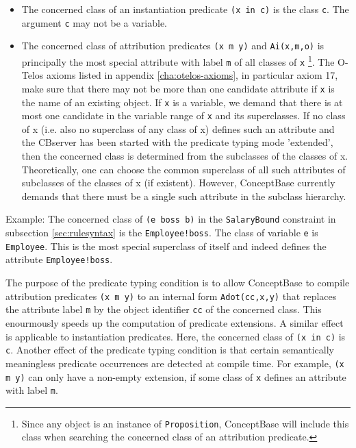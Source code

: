 \begin{itemize}
\item The concerned class of an instantiation predicate {\tt (x in c)} is the class {\tt c}.
The argument {\tt c} may not be a variable.
\item The concerned class of attribution predicates {\tt (x m y)} and {\tt Ai(x,m,o)} is principally the most 
special attribute with label {\tt m} of all classes of {\tt x}%
\footnote{Since any object is an instance of {\tt Proposition}, ConceptBase will include this class
when searching the concerned class of an attribution predicate.}.
The O-Telos axioms listed in
appendix \ref{cha:otelos-axioms}, in particular axiom 17, make sure that there may 
not be more than one
candidate attribute if {\tt x} is the name of an existing object. If {\tt x}
is a variable, we demand that there is at most one candidate in the variable range of {\tt x}
and its superclasses.
If no class of x (i.e. also no superclass of any class of x) defines such an attribute
and the CBserver has been started with the predicate typing mode 'extended', then
the concerned class is determined from the subclasses of the classes of x. Theoretically,
one can choose the common superclass of all such attributes of subclasses of the classes of x (if existent).
However, ConceptBase currently demands that there must be a single such attribute in the 
subclass hierarchy. 
\end{itemize}


Example: The concerned class of {\tt (e boss b)}  in the {\tt SalaryBound} constraint in subsection
\ref{sec:rulesyntax} is the {\tt Employee!boss}. The class of variable {\tt e} is {\tt Employee}. This
is the most special superclass of itself and indeed defines the attribute {\tt Employee!boss}.

The purpose of the predicate typing condition is to allow ConceptBase to compile
attribution predicates {\tt (x m y)} to an internal form {\tt Adot(cc,x,y)} that
replaces the attribute label {\tt m} by the object identifier {\tt cc} of the concerned class. 
This enourmously speeds up the computation of predicate extensions. 
A similar effect is applicable to instantiation predicates. Here, the
concerned class of {\tt (x in c)}  is {\tt c}. Another effect of the
predicate typing condition is that certain semantically meaningless 
predicate occurrences are detected at compile time. For example,
{\tt (x m y)} can only have a non-empty extension, if some class of
{\tt x} defines an attribute with label {\tt m}. 

